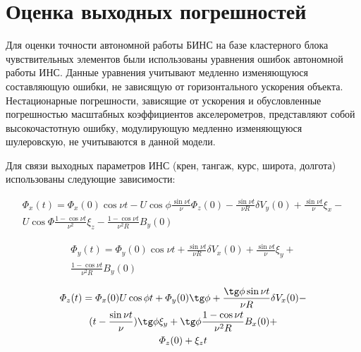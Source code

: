 \section {Оценка выходных погрешностей}

Для оценки точности автономной работы БИНС на базе кластерного блока чувствительных элементов были использованы уравнения ошибок автономной работы ИНС. Данные уравнения учитывают медленно изменяющуюся составляющую ошибки, не зависящую от горизонтального ускорения объекта. Нестационарные погрешности, зависящие от ускорения и обусловленные погрешностью масштабных коэффициентов акселерометров, представляют собой высокочастотную ошибку, модулирующую медленно изменяющуюся шулеровскую, не учитываются в данной модели. 


Для связи выходных параметров ИНС (крен, тангаж, курс, широта, долгота) использованы следующие зависимости:  


\begin{equation}
	\label{eq:phi_x}
	\begin{gathered}
		\varPhi_x(t) = \varPhi_x(0) \cos \nu t - 
		U \cos \phi \frac {\sin \nu t} {\nu} \varPhi_z(0) - 
		\frac{\sin \nu t}{ \nu R} \delta V_y(0) +
		\frac{\sin \nu t}{\nu} \xi_x -\\ 
		U \cos \varPhi \frac{1-\cos \nu t}{\nu^2}\xi_z - 
		\frac{1-\cos \nu t}{\nu^2R} B_y(0)
	\end{gathered}
\end{equation}


\begin{equation}
	\label{eq:phi_y}
		\begin{gathered}
		\varPhi_y(t) = \varPhi_y(0) \cos \nu t + 
		\frac {\sin \nu t} {\nu R} \delta V_x(0) +
		\frac{\sin \nu t}{\nu} \xi_y +\\  
		\frac{1 - \cos \nu t}{ \nu^2 R} B_y(0)
	\end{gathered}
\end{equation}


\begin{equation}
	\label{eq:phi_z}
	\begin{gathered}
		\varPhi_z(t) = \varPhi_x(0) U \cos \phi t + 
		\varPhi_y(0) \tg \phi + \frac{ \tg \phi \sin \nu t }{ \nu R } \delta V_x(0) - \\
		(t - \frac{\sin \nu t}{\nu}) \tg \phi \xi_y + \tg \phi \frac{ 1-\cos \nu t }{ \nu^2 R } B_x(0) + \\
		\varPhi_z(0) + \xi_z t
	\end{gathered}
\end{equation}


